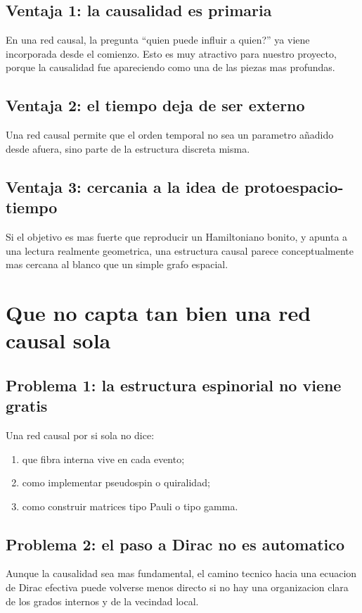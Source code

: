 \subsection{Ventaja 1: la causalidad es primaria}
En una red causal, la pregunta \enquote{quien puede influir a quien?} ya viene incorporada desde el comienzo. Esto es muy atractivo para nuestro proyecto, porque la causalidad fue apareciendo como una de las piezas mas profundas.

\subsection{Ventaja 2: el tiempo deja de ser externo}
Una red causal permite que el orden temporal no sea un parametro añadido desde afuera, sino parte de la estructura discreta misma.

\subsection{Ventaja 3: cercania a la idea de protoespacio-tiempo}
Si el objetivo es mas fuerte que reproducir un Hamiltoniano bonito, y apunta a una lectura realmente geometrica, una estructura causal parece conceptualmente mas cercana al blanco que un simple grafo espacial.

\section{Que no capta tan bien una red causal sola}
\subsection{Problema 1: la estructura espinorial no viene gratis}
Una red causal por si sola no dice:
\begin{enumerate}[label=\arabic*.]
    \item que fibra interna vive en cada evento;
    \item como implementar pseudospin o quiralidad;
    \item como construir matrices tipo Pauli o tipo gamma.
\end{enumerate}

\subsection{Problema 2: el paso a Dirac no es automatico}
Aunque la causalidad sea mas fundamental, el camino tecnico hacia una ecuacion de Dirac efectiva puede volverse menos directo si no hay una organizacion clara de los grados internos y de la vecindad local.


